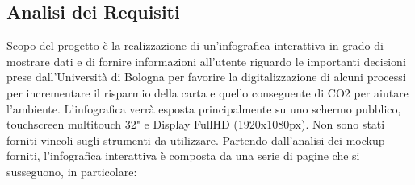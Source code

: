 \subsection{Analisi dei Requisiti}
\noindent Scopo del progetto è la realizzazione di un'infografica interattiva in grado di mostrare dati e di fornire 
informazioni all'utente riguardo le importanti decisioni prese dall'Università di Bologna per favorire la digitalizzazione di alcuni processi per incrementare il risparmio della carta e quello conseguente di CO2 per aiutare l'ambiente.\newline
L'infografica verrà esposta principalmente su uno schermo pubblico, touchscreen multitouch 32" e Display FullHD (1920x1080px).\newline
Non sono stati forniti vincoli sugli strumenti da utilizzare.
Partendo dall’analisi dei mockup forniti, l’infografica interattiva è composta da una serie di pagine che si susseguono, in particolare:\newline
